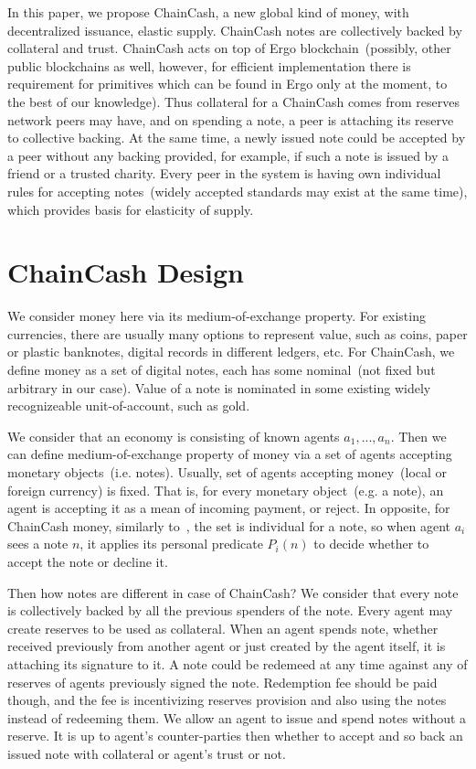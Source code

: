 \documentclass{article}   %
\newcommand{\cc}{ChainCash}
\begin{document}
In this paper, we propose \cc{}, a new global kind of money, with decentralized issuance, elastic supply. \cc{} notes are collectively backed by collateral and trust. \cc{} acts on top of Ergo blockchain~(possibly, other public blockchains as well,
however, for efficient implementation there is requirement for primitives which can be found in Ergo only at the moment, to the best of our knowledge). Thus collateral for a \cc{} comes from reserves network peers may have, and on spending a note, a peer is attaching its
reserve to collective backing. At the same time, a newly issued note could be accepted by a peer without any backing provided, for example, if such a note is issued by a friend or a trusted charity. Every peer in the system is having own individual rules
for accepting notes~(widely accepted standards may exist at the same time), which provides basis for elasticity of supply.

\section{\cc{} Design}

We consider money here via its medium-of-exchange property. For existing currencies, there are usually many options to represent value, such as coins, paper or plastic banknotes, digital records in different ledgers, etc. For \cc{}, we define money as a set of digital notes, each has some nominal~(not fixed but arbitrary in our case). Value of a note is nominated in some existing widely recognizeable unit-of-account, such as gold.

We consider that an economy is consisting of known agents $a_1, ..., a_n$. Then we can define medium-of-exchange property of money via a set of agents accepting monetary objects~(i.e. notes). Usually, set of agents accepting money~(local or foreign currency) is fixed. That is, for every monetary object~(e.g. a note), an agent is accepting it as a mean of incoming payment, or reject. In opposite, for \cc{} money, similarly to~\cite{saito2003peer}, the set is individual for a note, so when agent $a_i$ sees a note $n$, it applies its personal predicate $P_i(n)$ to decide whether to accept the note or decline it. 

Then how notes are different in case of \cc{}? We consider that every note is collectively backed by all the previous spenders of the note. Every agent may create reserves to be used as collateral. When an agent spends note, whether received previously from another agent or just created by the agent itself, it is attaching its signature to it. A note could be redemeed at any time against any of reserves of agents previously signed the note. Redemption fee should be paid though, and the fee is incentivizing reserves provision and also using the notes instead of redeeming them. We allow an agent to issue and spend notes without a reserve. It is up to agent's counter-parties then whether to accept and so back an issued note with collateral or agent's trust or not.
\end{document}
